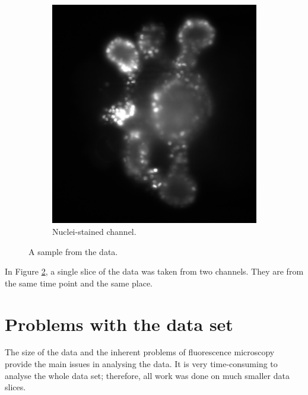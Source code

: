 \documentclass[
  digital,     %
  oneside,     %
  nosansbold,  %
  nocolorbold, %
  lof,         %
  lot,         %
]{fithesis4}
\begin{document}
\begin{figure}
\begin{subfigure}[t]{0.4\textwidth}
        \includegraphics[width=\textwidth]{resources/C2-t006-200-scaled.jpg}
        \caption{Nuclei-stained channel.}
        \label{fig:data_example_nuclei}
    \end{subfigure}
    \caption{A sample from the data.}
    \label{fig:data_example}
\end{figure}
In Figure \ref{fig:data_example}, a single slice of the data was taken from
two channels. They are from the same time point and the same place.

\section{Problems with the data set}

The size of the data and the inherent problems of fluorescence microscopy
provide the main issues in analysing the data. It is very time-consuming to
analyse the whole data set; therefore, all work was done on much smaller data slices.
\end{document}
